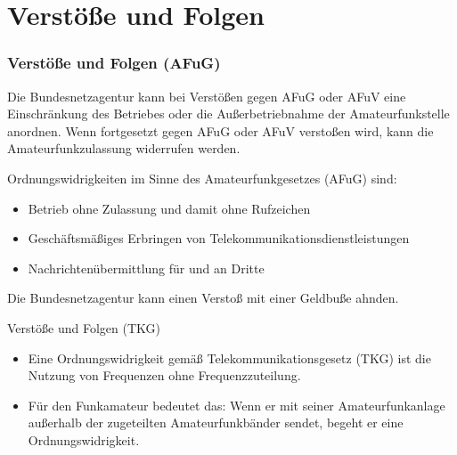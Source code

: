 \section{Verstöße und Folgen}
\label{section:verstoesse_und_folgen}
\begin{frame}%
    \frametitle{Verstöße und Folgen (AFuG)}
    Die Bundesnetzagentur kann bei Verstößen gegen AFuG oder AFuV eine Einschränkung des Betriebes oder die Außerbetriebnahme der Amateurfunkstelle anordnen. Wenn fortgesetzt gegen AFuG oder AFuV verstoßen wird, kann die Amateurfunkzulassung widerrufen werden.
    \begin{block}{Ordnungswidrigkeiten im Sinne des Amateurfunkgesetzes (AFuG) sind:}
        \begin{itemize}
            \item Betrieb ohne Zulassung und damit ohne Rufzeichen
            \item Geschäftsmäßiges Erbringen von Telekommunikationsdienstleistungen
            \item Nachrichtenübermittlung für und an Dritte
        \end{itemize}
    \end{block}
    Die Bundesnetzagentur kann einen Verstoß mit einer Geldbuße ahnden.
\end{frame}

\begin{frame}{Verstöße und Folgen (TKG)}
    \begin{itemize}
        \item Eine Ordnungswidrigkeit gemäß Telekommunikationsgesetz (TKG) ist
        die Nutzung von Frequenzen ohne Frequenzzuteilung.
        \item Für den Funkamateur bedeutet das: Wenn er mit seiner
        Amateurfunkanlage außerhalb der zugeteilten Amateurfunkbänder sendet,
        begeht er eine Ordnungswidrigkeit.
    \end{itemize}
\end{frame}


